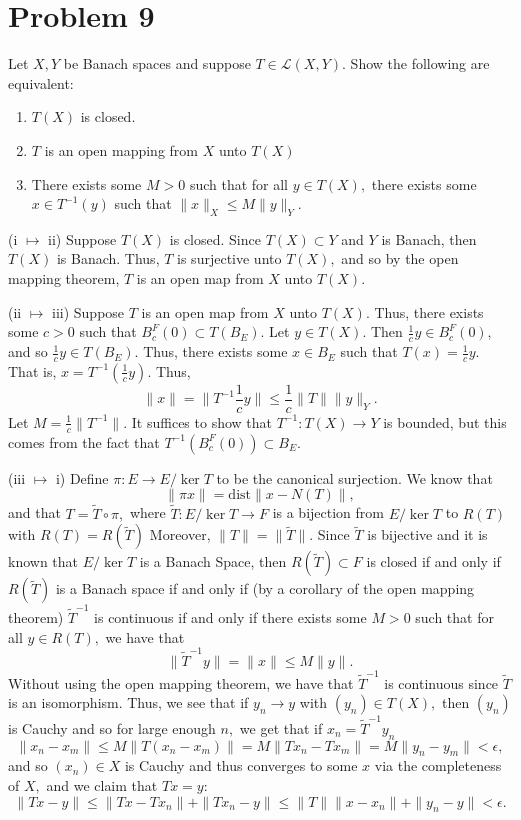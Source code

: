 \documentclass[11pt]{article}
\begin{document}
\section*{Problem 9}
\begin{problem}
    Let $X,Y$ be Banach spaces and suppose $T\in \mathcal{L}(X,Y).$ Show the following are equivalent:
    \begin{enumerate}
        \item $T(X)$ is closed.
        \item $T$ is an open mapping from $X$ unto $T(X)$
        \item There exists some $M>0$ such that for all $y\in T(X),$ there exists some $x\in T^{-1}(y)$ such that $\|x\|_X \leq M \|y\|_Y.$
    \end{enumerate}
\end{problem}
\begin{solution}
    (i $\mapsto$ ii) Suppose $T(X)$ is closed. Since $T(X)\subset Y$ and $Y$ is Banach, then $T(X)$ is Banach. Thus, $T$ is surjective unto $T(X),$ and so by the open mapping theorem, $T$ is an open map from $X$ unto $T(X).$

    (ii $\mapsto$ iii) Suppose $T$ is an open map from $X$ unto $T(X).$ Thus, there exists some $c>0$ such that $B^F_c(0)\subset T(B_E).$ Let $y \in T(X).$ Then $\frac{1}{c}y \in B_c^F(0),$ and so $\frac{1}{c}y \in T(B_E).$ Thus, there exists some $x\in B_E$ such that $T(x) = \frac{1}{c}y.$ That is, $x = T^{-1}(\frac{1}{c}y).$ Thus, 
    \[\|x\| = \|T^{-1}\frac{1}{c}y\| \leq \frac{1}{c}\|T\|\|y\|_Y.\] Let $M = \frac{1}{c}\|T^{-1}\|.$ It suffices to show that $T^{-1}: T(X)\to Y$ is bounded, but this comes from the fact that $T^{-1}(B_c^F(0))\subset B_E.$

    (iii $\mapsto$ i) Define $\pi: E \to E/\ker T$ to be the canonical surjection. We know that 
    \[\|\pi x\| = \text{dist}\|x- N(T)\|,\] and that $T = \tilde{T}\circ \pi,$ where $\tilde{T}: E/\ker T \to F$ is a bijection from $E/\ker T$ to $R(T)$ with $R(T) = R(\tilde{T})$ Moreover, $\|T\| = \|\tilde{T}\|.$ Since $\tilde{T}$ is bijective and it is known that $E/\ker T$ is a Banach Space, then $R(\tilde{T})\subset F$ is closed if and only if $R(\tilde{T})$ is a Banach space if and only if (by a corollary of the open mapping theorem) $\tilde{T}^{-1}$ is continuous if and only if there exists some $M>0$ such that for all $y\in R(T),$ we have that
    \[\|\tilde{T}^{-1}y\| = \|x\|\leq M\|y\|.\] Without using the open mapping theorem, we have that $\tilde{T}^{-1}$ is continuous since $\tilde{T}$ is an isomorphism. Thus, we see that if $y_n \to y$ with $(y_n)\in T(X),$ then $(y_n)$ is Cauchy and so for large enough $n,$ we get that if $x_n = \tilde{T}^{-1}y_n$
    \[\|x_n - x_m\| \leq M\|T(x_n - x_m)\| = M\|Tx_n - Tx_m\|= M\|y_n - y_m\|< \epsilon,\] and so $(x_n)\in X$ is Cauchy and thus converges to some $x$ via the completeness of $X,$ and we claim that $Tx = y:$
    \[\|Tx - y\|\leq \|Tx - Tx_n\| + \|Tx_n - y\| \leq \|T\|\|x - x_n\| + \|y_n - y\| < \epsilon.\]
\end{solution}
\end{document}
